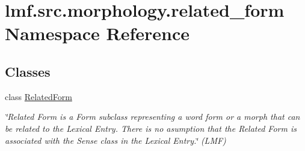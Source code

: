 \hypertarget{namespacelmf_1_1src_1_1morphology_1_1related__form}{\section{lmf.\+src.\+morphology.\+related\+\_\+form Namespace Reference}
\label{namespacelmf_1_1src_1_1morphology_1_1related__form}
}
\subsection*{Classes}
\begin{DoxyCompactItemize}
\item 
class \hyperlink{classlmf_1_1src_1_1morphology_1_1related__form_1_1_related_form}{Related\+Form}
\begin{DoxyCompactList}\small\item\em \char`\"{}\+Related Form is a Form subclass representing a word form or a morph that can be related to the Lexical Entry. There is no asumption that the Related Form is associated with the Sense class in the Lexical Entry.\char`\"{} (L\+M\+F) \end{DoxyCompactList}\end{DoxyCompactItemize}
